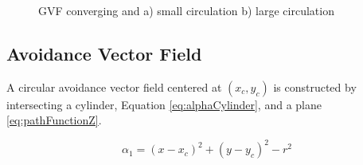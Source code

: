 \documentclass[numbered,pdftex]{ohio-etd}
\begin{document}
\begin{figure}[H]
	\begin{subfigmatrix}{2}%
		\centering	
		
		\hspace*{0mm}
	\end{subfigmatrix}
	\caption{GVF converging and a) small circulation b) large circulation}
	\label{fig:GVFLine}
\end{figure} 






\subsection{Avoidance Vector Field}
A circular avoidance vector field centered at $(x_c,y_c)$ is constructed by intersecting a cylinder, Equation \ref{eq:alphaCylinder}, and a plane \ref{eq:pathFunctionZ}. 

\begin{equation}\label{eq:alphaCylinder}
\alpha_1 = (x-x_c)^2 + (y-y_c)^2-r^2
\end{equation}
\end{document}
